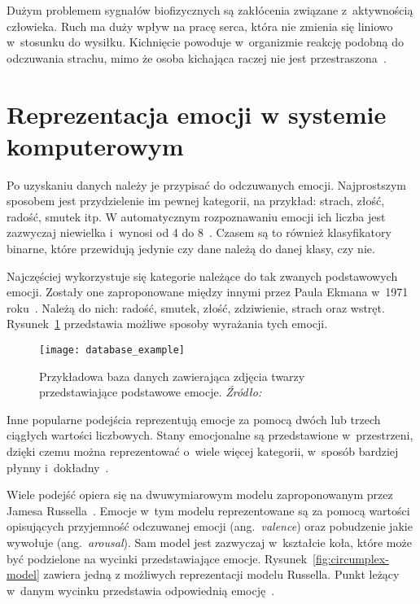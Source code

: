 Dużym problemem sygnałów biofizycznych są zakłócenia związane z~aktywnością człowieka.
Ruch ma duży wpływ na pracę serca, która nie zmienia się liniowo w~stosunku do wysiłku.
Kichnięcie powoduje w~organizmie reakcję podobną do odczuwania strachu, mimo że osoba kichająca raczej nie jest przestraszona~\cite{Calvo2015}.


\section{Reprezentacja emocji w systemie komputerowym}\label{sec:reprezentacja-emocji-w-systemie-komputerowym}

Po uzyskaniu danych należy je przypisać do odczuwanych emocji.
Najprostszym sposobem jest przydzielenie im pewnej kategorii, na przykład: strach, złość, radość, smutek itp.
W automatycznym rozpoznawaniu emocji ich liczba jest zazwyczaj niewielka i~wynosi od 4 do 8~\cite{Dzedzickis2020}.
Czasem są to również klasyfikatory binarne, które przewidują jedynie czy dane należą do danej klasy, czy nie.

Najczęściej wykorzystuje się kategorie należące do tak zwanych podstawowych emocji.
Zostały one zaproponowane między innymi przez Paula Ekmana w~1971 roku~\cite{Ekman1971}.
Należą do nich: radość, smutek, złość, zdziwienie, strach oraz wstręt.
Rysunek~\ref{fig:database-example} przedstawia możliwe sposoby wyrażania tych emocji.

\begin{figure}[h]
    \centering
    \texttt{[image: database\_example]}
    \caption{Przykładowa baza danych zawierająca zdjęcia twarzy przedstawiające podstawowe emocje. \textit{Źródło:~\cite{Li2017}}}
    \label{fig:database-example}
\end{figure}

Inne popularne podejścia reprezentują emocje za pomocą dwóch lub trzech ciągłych wartości liczbowych.
Stany emocjonalne są przedstawione w~przestrzeni, dzięki czemu można reprezentować o~wiele więcej kategorii, w~sposób bardziej płynny i~dokładny~\cite{Calvo2015}.

Wiele podejść opiera się na dwuwymiarowym modelu zaproponowanym przez Jamesa Russella~\cite{Russell1980}.
Emocje w~tym modelu reprezentowane są za pomocą wartości opisujących przyjemność odczuwanej emocji (ang.~\textit{valence}) oraz pobudzenie jakie wywołuje (ang.~\textit{arousal}).
Sam model jest zazwyczaj w~kształcie koła, które może być podzielone na wycinki przedstawiające emocje.
Rysunek~\ref{fig:circumplex-model} zawiera jedną z możliwych reprezentacji modelu Russella.
Punkt leżący w~danym wycinku przedstawia odpowiednią emocję~\cite{Dzedzickis2020}.

